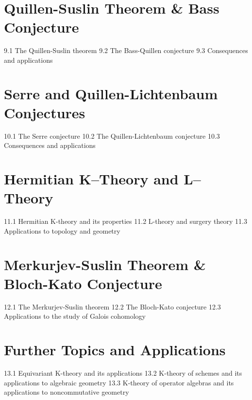 \section{Quillen-Suslin Theorem \& Bass Conjecture}
9.1 The Quillen-Suslin theorem
9.2 The Bass-Quillen conjecture
9.3 Consequences and applications
\section{Serre and Quillen-Lichtenbaum Conjectures}
10.1 The Serre conjecture
10.2 The Quillen-Lichtenbaum conjecture
10.3 Consequences and applications
\section{Hermitian K–Theory and L–Theory}
11.1 Hermitian K-theory and its properties
11.2 L-theory and surgery theory
11.3 Applications to topology and geometry
\section{Merkurjev-Suslin Theorem \& Bloch-Kato Conjecture}
12.1 The Merkurjev-Suslin theorem
12.2 The Bloch-Kato conjecture
12.3 Applications to the study of Galois cohomology
\section{Further Topics and Applications}
13.1 Equivariant K-theory and its applications
13.2 K-theory of schemes and its applications to algebraic geometry
13.3 K-theory of operator algebras and its applications to noncommutative geometry
